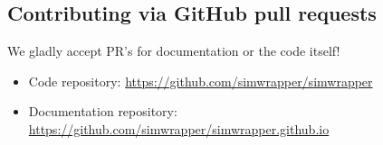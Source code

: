\hypertarget{contributing-via-github-pull-requests}{%
\subsection{Contributing via GitHub pull
requests}\label{contributing-via-github-pull-requests}}

We gladly accept PR's for documentation or the code itself!

\begin{itemize}
\tightlist
\item
  Code repository: \url{https://github.com/simwrapper/simwrapper}
\item
  Documentation repository:
  \url{https://github.com/simwrapper/simwrapper.github.io}
\end{itemize}
